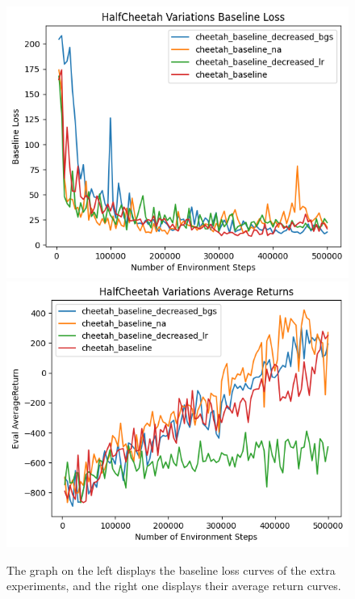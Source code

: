 \documentclass{article}
\begin{document}
\begin{sol}
\begin{figure}[h!]
    \end{figure}
    \begin{figure}[h!]
        \begin{center}
        \includegraphics[width=\textwidth/9*4]{q4_cheetah_variations_baseline_loss.png}
        \hspace*{1cm}
        \includegraphics[width=\textwidth/9*4]{q4_cheetah_variations_avg_returns.png}
        \end{center}
        \caption{\color{darkblue} The graph on the left displays the baseline loss curves of the extra experiments, and the right one displays their average return curves.}
    \end{figure}


\end{sol}
\end{document}
